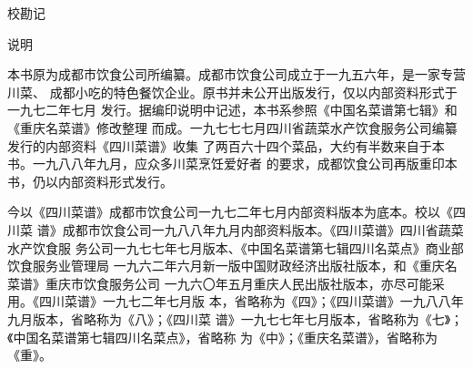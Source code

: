 %
%
%
%
%
%
%

校勘记

说明

本书原为成都市饮食公司所编纂。成都市饮食公司成立于一九五六年，是一家专营川菜、
成都小吃的特色餐饮企业。原书并未公开出版发行，仅以内部资料形式于一九七二年七月
发行。据编印说明中记述，本书系参照《中国名菜谱第七辑》和《重庆名菜谱》修改整理
而成。一九七七七月四川省蔬菜水产饮食服务公司编纂发行的内部资料《四川菜谱》收集
了两百六十四个菜品，大约有半数来自于本书。一九八八年九月，应众多川菜烹饪爱好者
的要求，成都饮食公司再版重印本书，仍以内部资料形式发行。

今以《四川菜谱》成都市饮食公司一九七二年七月内部资料版本为底本。校以《四川菜
谱》成都市饮食公司一九八八年九月内部资料版本。《四川菜谱》四川省蔬菜水产饮食服
务公司一九七七年七月版本、《中国名菜谱第七辑四川名菜点》商业部饮食服务业管理局
一九六二年六月新一版中国财政经济出版社版本，和《重庆名菜谱》重庆市饮食服务公司
一九六〇年五月重庆人民出版社版本，亦尽可能采用。《四川菜谱》一九七二年七月版
本，省略称为《四》；《四川菜谱》一九八八年九月版本，省略称为《八》；《四川菜
谱》一九七七年七月版本，省略称为《七》；《中国名菜谱第七辑四川名菜点》，省略称
为《中》；《重庆名菜谱》，省略称为《重》。


